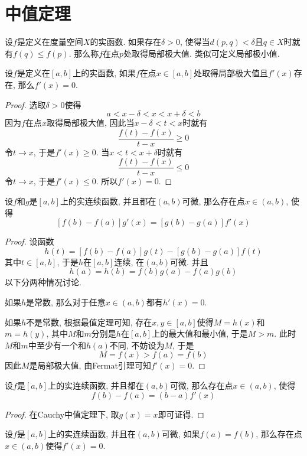 \documentclass[cn,12pt,math=mtpro2,citestyle=gb7714-2015,bibstyle=gb7714-2015,twocol]{elegantbook}
\begin{document}
\section{中值定理}
\begin{definition}\label{def:def5.1}
设$f$是定义在度量空间$X$的实函数. 如果存在$\delta>0$, 使得当$d(p,q)<\delta$且$q\in X$时就有$f(q)\leq f(p)$. 那么称$f$在点$p$处取得局部极大值. 类似可定义局部极小值.
\end{definition}
\begin{theorem}[Fermat引理]
  设$f$是定义在$[a,b]$上的实函数, 如果$f$在点$x\in [a,b]$处取得局部极大值且$f'(x)$存在, 那么$f'(x)=0$.
\end{theorem}
\begin{proof}
  选取$\delta>0$使得
  $$a<x-\delta<x<x+\delta<b$$
  因为$f$在点$x$取得局部极大值, 因此当$x-\delta<t<x$时就有
  $$\frac{f(t)-f(x)}{t-x}\geq 0$$
  令$t\rightarrow x$, 于是$f'(x)\geq 0$. 当$x<t<x+\delta$时就有
  $$\frac{f(t)-f(x)}{t-x}\leq 0$$
  令$t\rightarrow x$, 于是$f'(x)\leq 0$. 所以$f'(x)=0$.

\end{proof}
\begin{theorem}[Cauchy中值定理]
  设$f$和$g$是$[a,b]$上的实连续函数, 并且都在$(a,b)$可微, 那么存在点$x\in (a,b)$, 使得
  $$[f(b)-f(a)]g'(x)=[g(b)-g(a)]f'(x)$$
\end{theorem}
\begin{proof}
  设函数
  $$h(t)=[f(b)-f(a)]g(t)-[g(b)-g(a)]f(t)$$
  其中$t\in [a,b]$, 于是$h$在$[a,b]$连续, 在$(a,b)$可微. 并且
  $$h(a)=h(b)=f(b)g(a)-f(a)g(b)$$
  以下分两种情况讨论.

  如果$h$是常数, 那么对于任意$x\in (a,b)$都有$h'(x)=0$.

  如果$h$不是常数, 根据最值定理可知, 存在$x, y \in [a,b]$使得$M=h(x)$和$m=h(y)$, 其中$M$和$m$分别是$h$在$[a,b]$上的最大值和最小值, 于是$M>m$. 此时$M$和$m$中至少有一个和$h(a)$不同, 不妨设为$M$, 于是
  $$M=f(x)>f(a)=f(b)$$
  因此$M$是局部极大值, 由Fermat引理可知$f'(x)=0$.


\end{proof}
\begin{theorem}[Lagrange中值定理]
  设$f$是$[a,b]$上的实连续函数, 并且都在$(a,b)$可微, 那么存在点$x\in (a,b)$, 使得
  $$f(b)-f(a)=(b-a)f'(x)$$
\end{theorem}
\begin{proof}
  在Cauchy中值定理下, 取$g(x)=x$即可证得.

\end{proof}
\begin{corollary}[Rolle定理]
设$f$是$[a,b]$上的实连续函数, 并且在$(a,b)$可微, 如果$f(a)=f(b)$, 那么存在点$x\in(a,b)$使得$f'(x)=0$.
\end{corollary}
\end{document}
